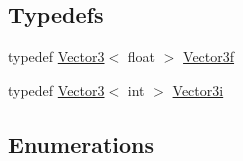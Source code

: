 \subsection*{Typedefs}
\begin{DoxyCompactItemize}
\item 
typedef \mbox{\hyperlink{classse_1_1_vector3}{Vector3}}$<$ float $>$ \mbox{\hyperlink{namespacese_a12e07512d95e2fdebdaf74a5ea2cf5f6}{Vector3f}}
\item 
typedef \mbox{\hyperlink{classse_1_1_vector3}{Vector3}}$<$ int $>$ \mbox{\hyperlink{namespacese_ada11715de7cf6e87b5dfb4611fe68d29}{Vector3i}}
\end{DoxyCompactItemize}
\subsection*{Enumerations}
